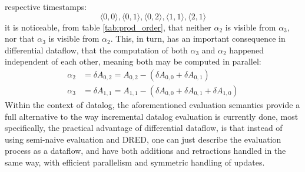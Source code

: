 \documentclass[sigconf,screen,review=false,natbib]{acmart}
\theoremstyle{definition}
\begin{document}
respective timestamps: \[\langle 0, 0 \rangle, \langle 0, 1 \rangle, \langle 0, 2 \rangle, \langle 1, 1 \rangle, \langle 2, 1 \rangle\]
it is noticeable, from table \ref{tab:prod_order}, that neither $\alpha_2$ is visible from $\alpha_3$, nor that $\alpha_3$ is visible
from $\alpha_2$. This, in turn, has an important consequence in differential dataflow, that the computation of both $\alpha_3$ and
$\alpha_2$ happened independent of each other, meaning both may be computed in parallel:
\begin{align*}
	\alpha_2 & = \delta A_{0, 2} = A_{0, 2} - (\delta A_{0, 0} + \delta A_{0, 1} )                  \\
	\alpha_3 & = \delta A_{1, 1} = A_{1, 1} - (\delta A_{0, 0} + \delta A_{0, 1} + \delta A_{1, 0})
\end{align*}
Within the context of datalog, the aforementioned evaluation semantics provide a full alternative to the way
incremental datalog evaluation is currently done, most specifically, the practical advantage of differential
dataflow, is that instead of using semi-naive evaluation and DRED, one can just describe the evaluation process
as a dataflow, and have both additions and retractions handled in the same way, with efficient parallelism and
symmetric handling of updates.
\end{document}
